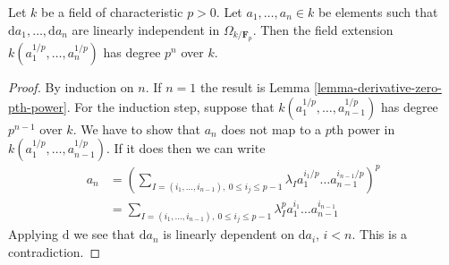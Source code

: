 \begin{lemma}
\label{lemma-size-extension-pth-roots}
Let $k$ be a field of characteristic $p > 0$.
Let $a_1, \ldots, a_n \in k$ be elements such that
$\text{d}a_1, \ldots, \text{d}a_n$ are linearly independent in
$\Omega_{k/\mathbf{F}_p}$. Then the field extension
$k(a_1^{1/p}, \ldots, a_n^{1/p})$ has degree $p^n$ over $k$.
\end{lemma}

\begin{proof}
By induction on $n$. If $n = 1$ the result is
Lemma \ref{lemma-derivative-zero-pth-power}.
For the induction step, suppose that $k(a_1^{1/p}, \ldots, a_{n - 1}^{1/p})$
has degree $p^{n - 1}$ over $k$. We have to show that $a_n$ does not
map to a $p$th power in $k(a_1^{1/p}, \ldots, a_{n - 1}^{1/p})$.
If it does then we can write
\begin{align*}
a_n & =
\left(\sum\nolimits_{I = (i_1, \ldots, i_{n - 1}),\ 0 \leq i_j \leq p - 1}
\lambda_I a_1^{i_1/p} \ldots a_{n - 1}^{i_{n - 1}/p}\right)^p \\
& = \sum\nolimits_{I = (i_1, \ldots, i_{n - 1}),\ 0 \leq i_j \leq p - 1}
\lambda_I^p a_1^{i_1} \ldots a_{n - 1}^{i_{n - 1}}
\end{align*}
Applying $\text{d}$ we see that $\text{d}a_n$ is linearly dependent on
$\text{d}a_i$, $i < n$. This is a contradiction.
\end{proof}
